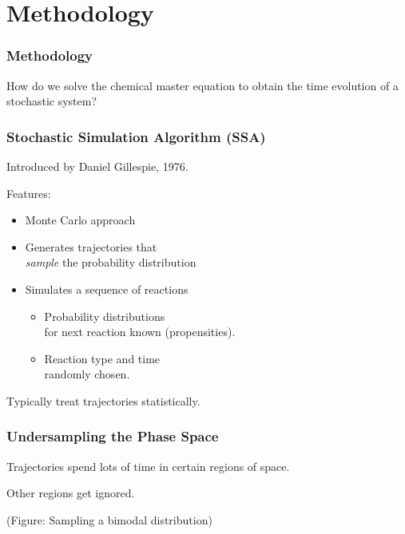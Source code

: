 \documentclass[xcolor={usenames,dvipsnames,svgnames}]{beamer}
\begin{document}

\section{Methodology} %
\label{sec:methodology}

\begin{frame}
    \frametitle{Methodology}
    How do we solve the chemical master equation to obtain the time evolution of a stochastic system?
\end{frame}

\begin{frame}
    \frametitle{Stochastic Simulation Algorithm (SSA)}
    Introduced by Daniel Gillespie, 1976.

    Features:
    \begin{itemize}
        \item Monte Carlo approach
        \item Generates trajectories that\\
            \emph{sample} the probability distribution
        \item Simulates a sequence of reactions
        \begin{itemize}
            \item Probability distributions\\
                for next reaction known (propensities).
            \item Reaction type and time\\
                randomly chosen.
        \end{itemize}
    \end{itemize}
    Typically treat trajectories statistically.
\end{frame}

\begin{frame}
    \frametitle{Undersampling the Phase Space}
    Trajectories spend lots of time in certain regions of space.

    Other regions get ignored.

    (Figure: Sampling a bimodal distribution)
\end{frame}
\end{document}

